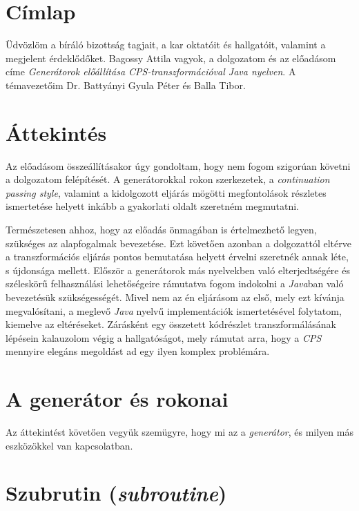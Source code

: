 \documentclass[12pt, a4paper]{article}
\begin{document}
\section{Címlap}
Üdvözlöm a bíráló bizottság tagjait, a kar oktatóit és hallgatóit, valamint a megjelent érdeklődőket. Bagossy Attila vagyok, a dolgozatom és az előadásom címe \textit{Generátorok előállítása CPS-transzformációval Java nyelven}. A témavezetőim Dr. Battyányi Gyula Péter és Balla Tibor.

\section{Áttekintés}
Az előadásom összeállításakor úgy gondoltam, hogy nem fogom szigorúan követni a dolgozatom felépítését. A generátorokkal rokon szerkezetek, a \textit{continuation passing style}, valamint a kidolgozott eljárás mögötti megfontolások részletes ismertetése helyett inkább a gyakorlati oldalt szeretném megmutatni. 

Természetesen ahhoz, hogy az előadás önmagában is értelmezhető legyen, szükséges az alapfogalmak bevezetése. Ezt követően azonban a dolgozattól eltérve a transzformációs eljárás pontos bemutatása helyett érvelni szeretnék annak léte, s újdonsága mellett. Először a generátorok más nyelvekben való elterjedtségére és széleskörű felhasználási lehetőségeire rámutatva fogom indokolni a \textit{Java}ban való bevezetésük szükségességét. Mivel nem az én eljárásom az első, mely ezt kívánja megvalósítani, a meglevő \textit{Java} nyelvű implementációk ismertetésével folytatom, kiemelve az eltéréseket. Zárásként egy összetett kódrészlet transzformálásának lépésein kalauzolom végig a hallgatóságot, mely rámutat arra, hogy a \textit{CPS} mennyire elegáns megoldást ad egy ilyen komplex problémára.

\section{A generátor és rokonai}

Az áttekintést követően vegyük szemügyre, hogy mi az a \textit{generátor}, és milyen más eszközökkel van kapcsolatban.

\section{Szubrutin (\textit{subroutine})}
\end{document}
